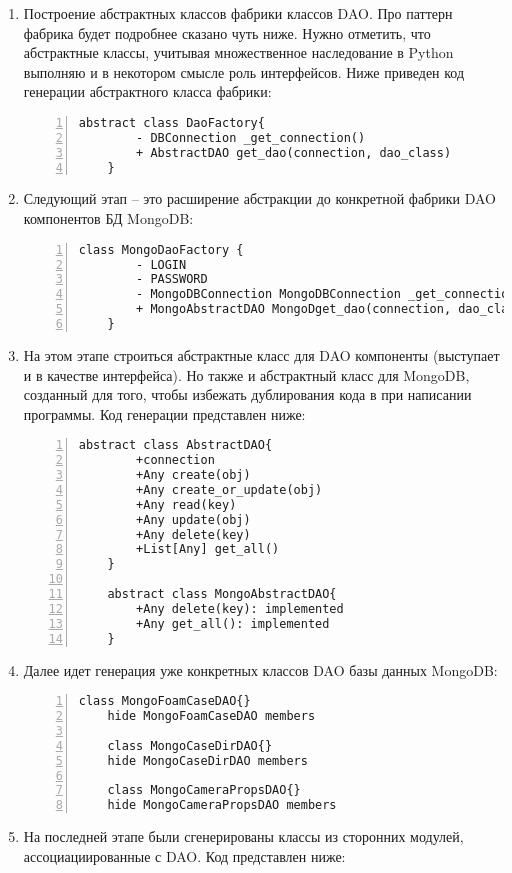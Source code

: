 \documentclass[14pt]{extreport}
\begin{document}
\begin{enumerate}[label=\Roman*.]
	\item Построение абстрактных классов фабрики классов DAO. Про паттерн фабрика будет подробнее сказано чуть ниже. Нужно отметить, что абстрактные классы, учитывая множественное наследование в Python выполняю и в некотором смысле роль интерфейсов.
	Ниже приведен код генерации абстрактного класса фабрики:
	\begin{Verbatim}[numbers=left,xleftmargin=5mm,fontsize=\small]
	abstract class DaoFactory{
		- DBConnection _get_connection()
		+ AbstractDAO get_dao(connection, dao_class)
	}
	\end{Verbatim}
	\item Следующий этап -- это расширение абстракции до конкретной фабрики DAO компонентов БД MongoDB:
	\begin{Verbatim}[numbers=left,xleftmargin=5mm,fontsize=\small]
	class MongoDaoFactory {
		- LOGIN
		- PASSWORD
		- MongoDBConnection MongoDBConnection _get_connection()
		+ MongoAbstractDAO MongoDget_dao(connection, dao_class)
	}
	\end{Verbatim}
	
	\item На этом этапе строиться абстрактные класс для DAO компоненты (выступает и в качестве интерфейса). Но также и абстрактный класс для MongoDB, созданный для того, чтобы избежать дублирования кода в при написании программы. Код генерации представлен ниже:
	\begin{Verbatim}[numbers=left,xleftmargin=5mm,fontsize=\small]
	abstract class AbstractDAO{
		+connection
		+Any create(obj)
		+Any create_or_update(obj)
		+Any read(key)
		+Any update(obj)
		+Any delete(key)
		+List[Any] get_all()
	}
	
	abstract class MongoAbstractDAO{
		+Any delete(key): implemented
		+Any get_all(): implemented
	}
	\end{Verbatim}

	\item Далее идет генерация уже конкретных классов DAO базы данных MongoDB:
	\begin{Verbatim}[numbers=left,xleftmargin=5mm,fontsize=\small]
	class MongoFoamCaseDAO{}
	hide MongoFoamCaseDAO members
	
	class MongoCaseDirDAO{}
	hide MongoCaseDirDAO members
	
	class MongoCameraPropsDAO{}
	hide MongoCameraPropsDAO members
	\end{Verbatim}

	\item На последней этапе были сгенерированы классы из сторонних модулей, ассоциациированные с DAO. Код представлен ниже:
	

\end{enumerate}
\end{document}
